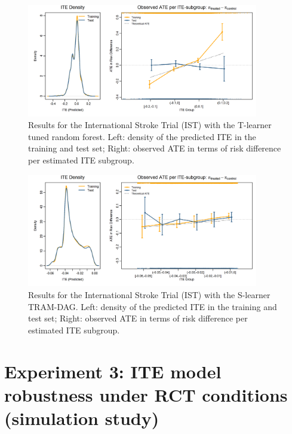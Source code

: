 \begin{figure}[htbp]
\centering
\includegraphics[width=0.9\textwidth]{img/results_IST/IST_tuned_rf_tlearner_density_ITE_ATE.png}
\caption{Results for the International Stroke Trial (IST) with the T-learner tuned random forest. Left: density of the predicted ITE in the training and test set; Right: observed ATE in terms of risk difference per estimated ITE subgroup.}
\label{fig:IST_density_ITE_ATE_tuned_rf}
\end{figure}


\begin{figure}[htbp]
\centering
\includegraphics[width=0.9\textwidth]{img/results_IST/IST_TRAM_DAG_slearner_density_ITE_ATE.png}
\caption{Results for the International Stroke Trial (IST) with the S-learner TRAM-DAG. Left: density of the predicted ITE in the training and test set; Right: observed ATE in terms of risk difference per estimated ITE subgroup.}
\label{fig:IST_density_ITE_ATE_TRAM_DAG}
\end{figure}



\clearpage

 
\section{Experiment 3: ITE model robustness under RCT conditions (simulation study)} \label{sec:results_experiment3}

